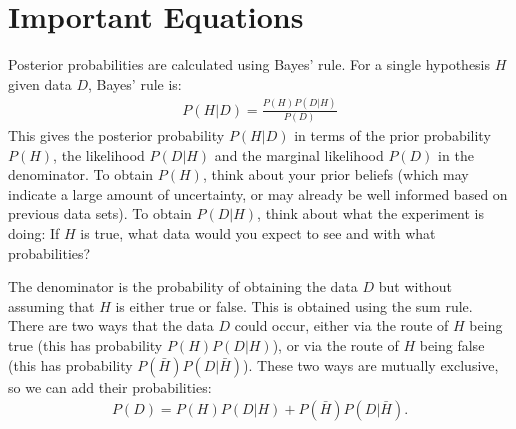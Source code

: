 \section{Important Equations}
Posterior probabilities are calculated using Bayes' rule. For a single
hypothesis $H$ given data $D$, Bayes' rule is:
\begin{eqnarray}
P(H|D) = \frac{P(H)P(D|H)}{P(D)}\label{eq:bayes1}
\end{eqnarray}
This gives the posterior probability $P(H|D)$ in terms of the prior probability
$P(H)$, the likelihood $P(D|H)$ and the marginal likelihood $P(D)$ in the
denominator. To obtain $P(H)$, think about your prior beliefs (which may
indicate a large amount of uncertainty, or may already be well informed based
on previous data sets). To obtain $P(D|H)$, think about what the experiment is
doing: If $H$ is true, what data would you expect to see and with what
probabilities?

The denominator is the probability of obtaining the data $D$ but without
assuming that $H$ is either true or false. This is obtained using the sum rule.
There are two ways that the data $D$ could occur, either via the route of $H$
being true (this has probability $P(H)P(D|H)$), or via the route of $H$ being
false (this has probability $P(\bar{H})P(D|\bar{H})$). These two ways are
mutually exclusive, so we can add their probabilities:
\begin{eqnarray}
P(D) = P(H)P(D|H) + P(\bar{H})P(D|\bar{H}).
\end{eqnarray}


